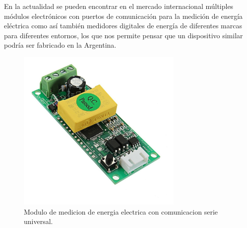 En la actualidad se pueden encontrar en el mercado internacional múltiples módulos electrónicos con puertos de comunicación para la medición de energía eléctrica como así también medidores digitales de energía de diferentes marcas para diferentes entornos, los que nos permite pensar que un dispositivo similar podría ser fabricado en la Argentina.

\begin{figure}[h]
	\centering
	\includegraphics[width=80mm,keepaspectratio]{Figures/pzeem004.jpg}
	\caption{Modulo de medicion de energia electrica con comunicacion serie universal.}
	\label{fig:texmaker}
\end{figure}







